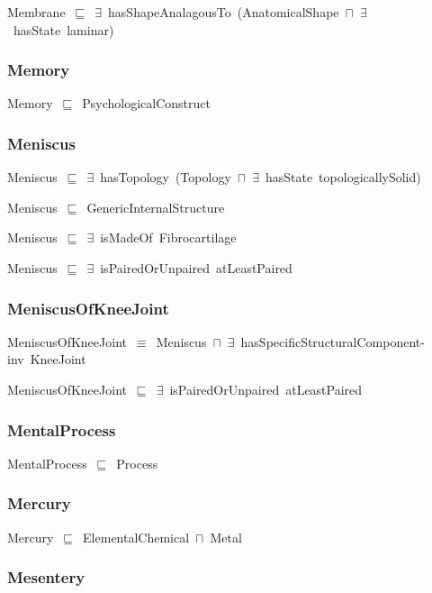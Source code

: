 \documentclass{article}
\begin{document}
Membrane~\ensuremath{\sqsubseteq}~\ensuremath{\exists}~hasShapeAnalagousTo~(AnatomicalShape~\ensuremath{\sqcap}~\ensuremath{\exists}~hasState~laminar)~

\subsubsection*{Memory}

Memory~\ensuremath{\sqsubseteq}~PsychologicalConstruct~

\subsubsection*{Meniscus}

Meniscus~\ensuremath{\sqsubseteq}~\ensuremath{\exists}~hasTopology~(Topology~\ensuremath{\sqcap}~\ensuremath{\exists}~hasState~topologicallySolid)~

Meniscus~\ensuremath{\sqsubseteq}~GenericInternalStructure~

Meniscus~\ensuremath{\sqsubseteq}~\ensuremath{\exists}~isMadeOf~Fibrocartilage~

Meniscus~\ensuremath{\sqsubseteq}~\ensuremath{\exists}~isPairedOrUnpaired~atLeastPaired~

\subsubsection*{MeniscusOfKneeJoint}

MeniscusOfKneeJoint~\ensuremath{\equiv}~Meniscus~\ensuremath{\sqcap}~\ensuremath{\exists}~hasSpecificStructuralComponent-inv~KneeJoint

MeniscusOfKneeJoint~\ensuremath{\sqsubseteq}~\ensuremath{\exists}~isPairedOrUnpaired~atLeastPaired~

\subsubsection*{MentalProcess}

MentalProcess~\ensuremath{\sqsubseteq}~Process~

\subsubsection*{Mercury}

Mercury~\ensuremath{\sqsubseteq}~ElementalChemical~\ensuremath{\sqcap}~Metal~

\subsubsection*{Mesentery}
\end{document}
